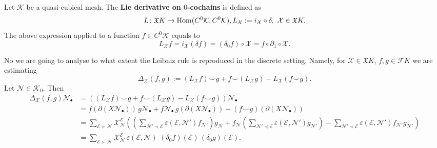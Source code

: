 \begin{definition}
  Let $\mathcal{K}$ be a quasi-cubical mesh.
  The \textbf{Lie derivative on $0$-cochains} is defined as
  \begin{equation}
    L \colon \mathfrak{X} K \to \mathop{\rm Hom}\nolimits(C^0 \mathcal{K}, C^0 \mathcal{K}),
    L_{\mathcal{X}} := i_{\mathcal{X}} \circ \delta,\
    \mathcal{X} \in \mathfrak{X} K.
  \end{equation}
  The above expression applied to a function $f \in C^0 \mathcal{K}$ equals to
  \begin{equation}
    L_{\mathcal{X}} f
    = i_{\mathcal{X}} (\delta f)
    = (\delta_0 f) \circ \mathcal{X}
    = f \circ \partial_1 \circ \mathcal{X}.
  \end{equation}
\end{definition}
\begin{remark}
  No we are going to analyse to what extent the Leibniz rule is reproduced in
  the discrete setting.
  Namely, for
  $\mathcal{X} \in \mathfrak{X} K$, $f, g \in \mathcal{F} K$
  we are estimating
  \begin{equation}
    \Delta_\mathcal{X}(f, g) :=
    (L_{\mathcal{X}} f) \smile g
    + f \smile (L_{\mathcal{X}} g)
    - L_{\mathcal{X}} (f \smile g).
  \end{equation}
  Let $\mathcal{N} \in \mathcal{K}_0$.
  Then
  \begin{equation}
    \begin{split}
        \Delta_\mathcal{X}(f, g) \mathcal{N}_\bullet
      & =
        ((L_{\mathcal{X}} f) \smile g + f \smile (L_{\mathcal{X}} g)
        - L_{\mathcal{X}} (f \smile g)) \mathcal{N}_\bullet \\
      & = f (\partial(X \mathcal{N}_\bullet))\, g \mathcal{N}_\bullet
        + f \mathcal{N}_\bullet\, g (\partial(X \mathcal{N}_\bullet))
        - (f \smile g)(\partial(X \mathcal{N}_\bullet)) \\
      & = \sum_{\mathcal{E} \succ \mathcal{N}}
        \mathcal{X}_\mathcal{N}^\mathcal{E}
        ( (\sum_{\mathcal{N}' \prec \mathcal{E}}
          \varepsilon(\mathcal{E}, \mathcal{N}') f_{\mathcal{N}'})
          g_{\mathcal{N}}
          + f_{\mathcal{N}} (\sum_{\mathcal{N}' \prec \mathcal{E}}
          \varepsilon(\mathcal{E}, \mathcal{N}') g_{\mathcal{N}'})
          - \sum_{\mathcal{N}' \prec \mathcal{E}}
          \varepsilon(\mathcal{E}, \mathcal{N}')
          f_{\mathcal{N}'} g_{\mathcal{N}'}
        ) \\
      & = \sum_{\mathcal{E} \succ \mathcal{N}}
        \mathcal{X}_\mathcal{N}^\mathcal{E}\,
        \varepsilon(\mathcal{E}, \mathcal{N})\,
        \, (\delta_0 f)(\mathcal{E})\,
        (\delta_0 g)(\mathcal{E}).
    \end{split}
  \end{equation}
\end{remark}
